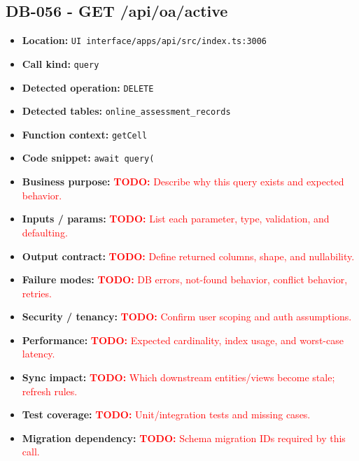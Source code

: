 \documentclass[11pt]{article}
\newcommand{\todoitem}[1]{\textcolor{red}{\textbf{TODO:} #1}}
\begin{document}
\subsection{DB-056 - GET /api/oa/active}
\begin{itemize}[leftmargin=1.5em]
\item \textbf{Location:} \texttt{UI interface/apps/api/src/index.ts:3006}
\item \textbf{Call kind:} \texttt{query}
\item \textbf{Detected operation:} \texttt{DELETE}
\item \textbf{Detected tables:} \texttt{online\_assessment\_records}
\item \textbf{Function context:} \texttt{getCell}
\item \textbf{Code snippet:} \texttt{await query(}
\item \textbf{Business purpose:} \todoitem{Describe why this query exists and expected behavior.}
\item \textbf{Inputs / params:} \todoitem{List each parameter, type, validation, and defaulting.}
\item \textbf{Output contract:} \todoitem{Define returned columns, shape, and nullability.}
\item \textbf{Failure modes:} \todoitem{DB errors, not-found behavior, conflict behavior, retries.}
\item \textbf{Security / tenancy:} \todoitem{Confirm user scoping and auth assumptions.}
\item \textbf{Performance:} \todoitem{Expected cardinality, index usage, and worst-case latency.}
\item \textbf{Sync impact:} \todoitem{Which downstream entities/views become stale; refresh rules.}
\item \textbf{Test coverage:} \todoitem{Unit/integration tests and missing cases.}
\item \textbf{Migration dependency:} \todoitem{Schema migration IDs required by this call.}
\end{itemize}
\end{document}
